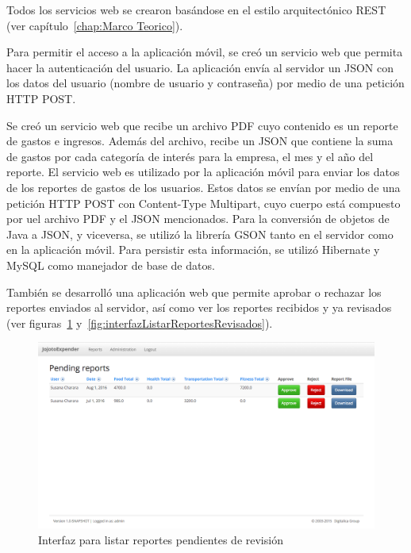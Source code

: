 Todos los servicios web se crearon basándose en el estilo arquitectónico REST (ver capítulo~\ref{chap:Marco Teorico}). 

Para permitir el acceso a la aplicación móvil, se creó un servicio web que permita hacer la autenticación del usuario. La aplicación envía al servidor un JSON con los datos del usuario (nombre de usuario y contraseña) por medio de una petición HTTP POST.

Se creó un servicio web que recibe un archivo PDF cuyo contenido es un reporte de gastos e ingresos. Además del archivo, recibe un JSON que contiene la suma de gastos por cada categoría de interés para la empresa, el mes y el año del reporte. El servicio web es utilizado por la aplicación móvil para enviar los datos de los reportes de gastos de los usuarios. Estos datos se envían por medio de una petición HTTP POST con Content-Type Multipart, cuyo cuerpo está compuesto por uel archivo PDF y el JSON mencionados. Para la conversión de objetos de Java a JSON, y viceversa, se utilizó la librería GSON tanto en el servidor como en la aplicación móvil. Para persistir esta información, se utilizó Hibernate y MySQL como manejador de base de datos.

También se desarrolló una aplicación web que permite aprobar o rechazar los reportes enviados al servidor, así como ver los reportes recibidos y ya revisados (ver figuras~\ref{fig:interfazListarReportesPendientes} y~\ref{fig:interfazListarReportesRevisados}). 

\begin{figure}[ht]
  \centering
  \includegraphics[scale=0.38,type=png,ext=.png,read=.png]{imagenes/pending_reports}
  \captionsetup{justification=centering}
  \caption{Interfaz para listar reportes pendientes de revisión}
  \label{fig:interfazListarReportesPendientes}
\end{figure}

